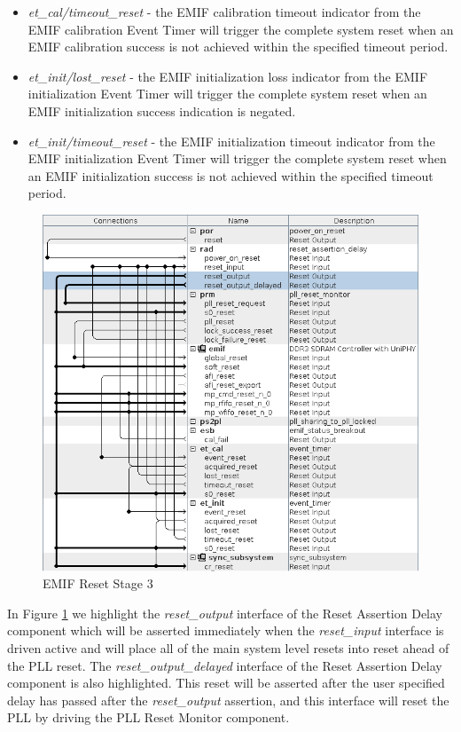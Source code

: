 \documentclass{article}
\begin{document}
\begin{flushleft}
\begin{itemize}
\item \emph{et\_cal/timeout\_reset} - the EMIF calibration timeout indicator from the EMIF calibration Event Timer will trigger the complete system reset when an EMIF calibration success is not achieved within the specified timeout period.

\item \emph{et\_init/lost\_reset} - the EMIF initialization loss indicator from the EMIF initialization Event Timer will trigger the complete system reset when an EMIF initialization success indication is negated.

\item \emph{et\_init/timeout\_reset} - the EMIF initialization timeout indicator from the EMIF initialization Event Timer will trigger the complete system reset when an EMIF initialization success is not achieved within the specified timeout period.

\end{itemize}

\begin{figure}[H]
\centering
\includegraphics[scale=0.675]{emif_reset_stage_3}
\caption{EMIF Reset Stage 3}
\label{fig:emif_reset_stage_3}
\end{figure}

In Figure \ref{fig:emif_reset_stage_3} we highlight the \emph{reset\_output} interface of the Reset Assertion Delay component which will be asserted immediately when the \emph{reset\_input} interface is driven active and will place all of the main system level resets into reset ahead of the PLL reset.  The \emph{reset\_output\_delayed} interface of the Reset Assertion Delay component is also highlighted.  This reset will be asserted after the user specified delay has passed after the \emph{reset\_output} assertion, and this interface will reset the PLL by driving the PLL Reset Monitor component.


\end{flushleft}
\end{document}
